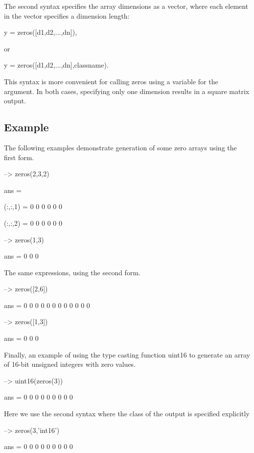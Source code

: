 The second syntax specifies the array dimensions as a vector, where each element in the vector specifies a dimension length\-: \begin{DoxyVerb}   y = zeros([d1,d2,...,dn]),
\end{DoxyVerb}
 or \begin{DoxyVerb}   y = zeros([d1,d2,...,dn],classname).
\end{DoxyVerb}
 This syntax is more convenient for calling {\ttfamily zeros} using a variable for the argument. In both cases, specifying only one dimension results in a square matrix output. \hypertarget{variables_struct_Example}{}\subsection{Example}\label{variables_struct_Example}
The following examples demonstrate generation of some zero arrays using the first form.


\begin{DoxyVerbInclude}
--> zeros(2,3,2)

ans = 

(:,:,1) = 
 0 0 0 
 0 0 0 

(:,:,2) = 
 0 0 0 
 0 0 0 

--> zeros(1,3)

ans = 
 0 0 0 
\end{DoxyVerbInclude}


The same expressions, using the second form.


\begin{DoxyVerbInclude}
--> zeros([2,6])

ans = 
 0 0 0 0 0 0 
 0 0 0 0 0 0 

--> zeros([1,3])

ans = 
 0 0 0 
\end{DoxyVerbInclude}


Finally, an example of using the type casting function {\ttfamily uint16} to generate an array of 16-\/bit unsigned integers with zero values.


\begin{DoxyVerbInclude}
--> uint16(zeros(3))

ans = 
 0 0 0 
 0 0 0 
 0 0 0 
\end{DoxyVerbInclude}


Here we use the second syntax where the class of the output is specified explicitly


\begin{DoxyVerbInclude}
--> zeros(3,'int16')

ans = 
 0 0 0 
 0 0 0 
 0 0 0 
\end{DoxyVerbInclude}
 